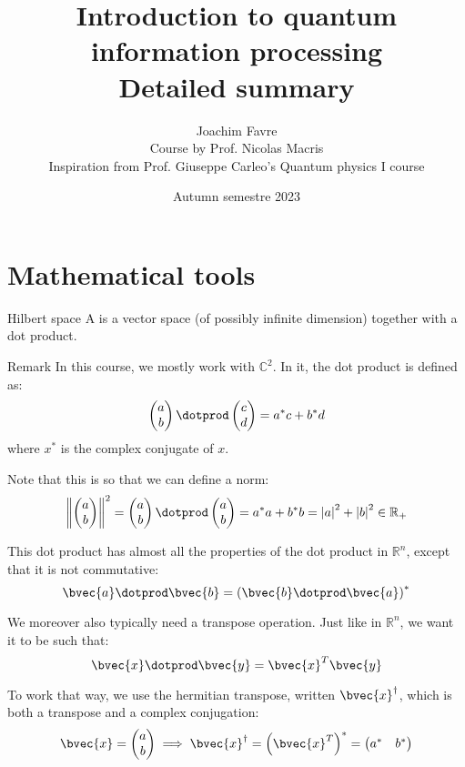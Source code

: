 \documentclass[a4paper]{article}
\title{Introduction to quantum information processing \\ Detailed summary}
\author{Joachim Favre \\ Course by Prof. Nicolas Macris \\ Inspiration from Prof. Giuseppe Carleo's Quantum physics I course}
\date{Autumn semestre 2023}
\begin{document}
\maketitle

\section{Mathematical tools}

\begin{parag}{Hilbert space}
    A  is a vector space (of possibly infinite dimension) together with a dot product.

    \begin{subparag}{Remark}
        In this course, we mostly work with $\mathbb{C}^2$. In it, the dot product is defined as: 
        \[\begin{pmatrix} a \\ b \end{pmatrix} \dotprod \begin{pmatrix} c \\ d \end{pmatrix} = a^* c + b^* d\]
        where $x^*$ is the complex conjugate of $x$.

        Note that this is so that we can define a norm: 
        \[\left\|\begin{pmatrix} a \\ b \end{pmatrix} \right\|^2 = \begin{pmatrix} a \\ b \end{pmatrix} \dotprod \begin{pmatrix} a \\ b \end{pmatrix} = a^* a + b^* b = \left|a\right|^2 + \left|b\right|^2 \in \mathbb{R}_+\]

        This dot product has almost all the properties of the dot product in $\mathbb{R}^n$, except that it is not commutative: 
        \[\bvec{a} \dotprod \bvec{b} = \left(\bvec{b} \dotprod \bvec{a}\right)^*\]

        We moreover also typically need a transpose operation. Just like in $\mathbb{R}^n$, we want it to be such that:
        \[\bvec{x} \dotprod \bvec{y} = \bvec{x}^T \bvec{y}\]

        To work that way, we use the hermitian transpose, written $\bvec{x}^{\dagger}$, which is both a transpose and a complex conjugation: 
        \[\bvec{x} = \begin{pmatrix} a \\ b \end{pmatrix} \implies \bvec{x}^{\dagger} = \left(\bvec{x}^T\right)^* = \begin{pmatrix} a^* & b^* \end{pmatrix} \]
    \end{subparag}
\end{parag}
\end{document}
